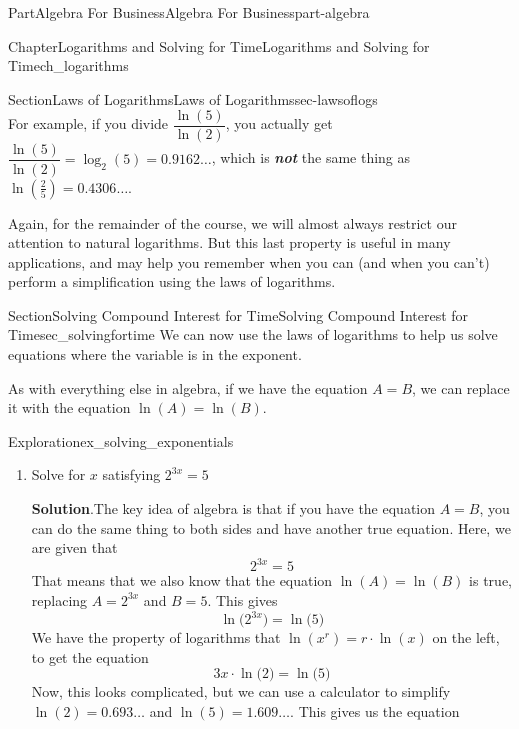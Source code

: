 \documentclass{tufte-book}
\newcommand{\blocktitlefont}{\relax}
\newcommand{\alert}[1]{\textbf{\textit{#1}}}
\numberwithin{equation}{chapter}
\begin{document}
\begin{partptx}{Part}{Algebra For Business}{}{Algebra For Business}{}{}{part-algebra}
\begin{chapterptx}{Chapter}{Logarithms and Solving for Time}{}{Logarithms and Solving for Time}{}{}{ch_logarithms}
\begin{sectionptx}{Section}{Laws of Logarithms}{}{Laws of Logarithms}{}{}{sec-lawsoflogs}
\begin{equation*}
\end{equation*}
For example, if you divide   \(\dfrac{\ln(5)}{\ln(2)}\), you actually get \(\dfrac{\ln(5)}{\ln(2)} = \log_2(5) = 0.9162\dots\), which is \alert{not} the same thing as \(\ln\left(\frac{2}{5}
\right)=0.4306\dots\).%
\par
Again, for the remainder of the course, we will almost always restrict our attention to natural logarithms. But this last property is useful in many applications, and may help you remember when you can (and when you can't) perform a simplification using the laws of logarithms.%
\end{sectionptx}
%
%
\typeout{************************************************}
\typeout{************************************************}
%
\begin{sectionptx}{Section}{Solving Compound Interest for Time}{}{Solving Compound Interest for Time}{}{}{sec_solvingfortime}
We can now use the laws of logarithms to help us solve equations where the variable is in the exponent.%
\par
As with everything else in algebra, if we have the equation \(A = B\), we can replace it with the equation \(\ln(A) = \ln(B)\).%
\begin{exploration}{Exploration}{}{ex_solving_exponentials}%
\begin{enumerate}[font=\bfseries,label=(\alph*),ref=\alph*]%
\item{}Solve for \(x\) satisfying \(2^{3x} = 5\)%
\par\smallskip%
\noindent\textbf{\blocktitlefont Solution}.\hypertarget{ex_solving_exponentials-1-2}{}\quad{}The key idea of algebra is that if you have the equation \(A = B\), you can do the same thing to both sides and have another true equation. Here, we are given that%
\begin{equation*}
2^{3x} = 5
\end{equation*}
That means that we also know that the equation \(\ln(A) = \ln(B)\) is true, replacing \(A=2^{3x}\) and \(B=5\).  This gives%
\begin{equation*}
\ln\Big(2^{3x}\Big) = \ln\Big( 5 \Big)
\end{equation*}
We have the property of logarithms that \(\ln(x^r) = r\cdot\ln(x)\) on the left, to get the equation%
\begin{equation*}
3x \cdot \ln\Big(2\Big) = \ln\Big( 5 \Big)
\end{equation*}
Now, this looks complicated, but we can use a calculator to simplify \(\ln(2) = 0.693\dots\) and \(\ln(5) = 1.609\dots\).  This gives us the equation%

\end{enumerate}
\end{exploration}
\end{sectionptx}
\end{chapterptx}
\end{partptx}
\end{document}
